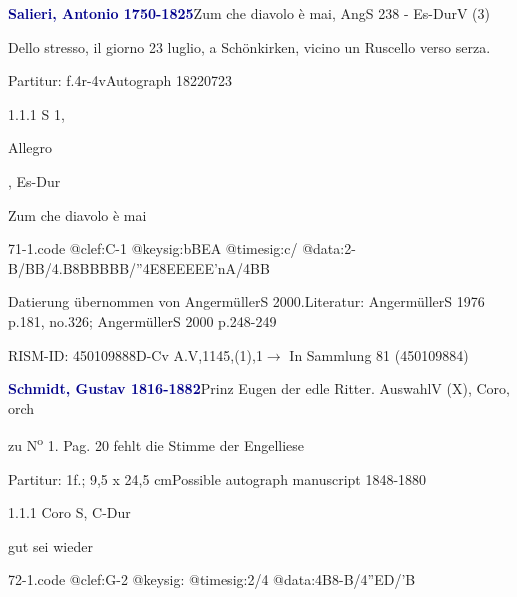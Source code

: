 \documentclass[a4paper, twocolumn, 11pt]{book}
\begin{document}
\par \vspace{16pt} \textcolor{darkblue}{\textbf{Salieri, Antonio  1750-1825}}\hfillplus{[71]}\newline Zum che diavolo è mai, AngS 238 - Es-Dur\newline V (3)
\par \begin{itshape} Dello stresso, il giorno 23 luglio, a Schönkirken, vicino un Ruscello verso serza.\end{itshape} 
\par \textcolor{darkblue}{}  Partitur: f.4r-4v\newline Autograph  18220723
\par 1.1.1  S 1, \begin{itshape}Allegro\end{itshape}, Es-Dur\newline \begin{footnotesize} Zum che diavolo è mai \end{footnotesize}  
\begin{filecontents*}{71-1.code}
@clef:C-1
@keysig:bBEA
@timesig:c/
@data:2-B/BB/4.B8BBBBB/''4E8EEEEE'nA/4BB
\end{filecontents*}

\newline %
\par Datierung übernommen von AngermüllerS 2000.\newline Literatur: AngermüllerS 1976  p.181, no.326; AngermüllerS 2000  p.248-249
\par RISM-ID: 450109888\newline D-Cv  A.V,1145,(1),1\newline $\rightarrow$ In Sammlung 81 (450109884)
      
\par \vspace{16pt} \textcolor{darkblue}{\textbf{Schmidt, Gustav  1816-1882}}\hfillplus{[72]}\newline Prinz Eugen der edle Ritter. Auswahl\newline V (X), Coro, orch
\par \begin{itshape} zu N\textsuperscript{o} 1. Pag. 20 fehlt die Stimme der Engelliese\end{itshape} 
\par \textcolor{darkblue}{}  Partitur: 1f.; 9,5 x 24,5 cm\newline Possible autograph manuscript  1848-1880
\par 1.1.1  Coro S, C-Dur\newline \begin{footnotesize} [...] gut sei wieder \end{footnotesize}  
\begin{filecontents*}{72-1.code}
@clef:G-2
@keysig:
@timesig:2/4
@data:4B8-B/4''ED/'B
\end{filecontents*}
\end{document}
